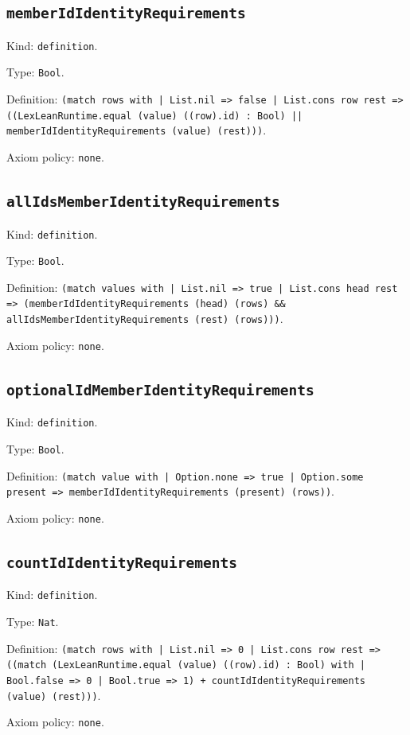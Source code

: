 \documentclass[11pt]{article}
\begin{document}
\subsection*{\texttt{memberIdIdentityRequirements}}
\noindent Kind: \texttt{definition}.\par
\noindent Type: \texttt{Bool}.\par
\noindent Definition: \texttt{(match rows with | List.nil => false | List.cons row rest => ((LexLeanRuntime.equal (value) ((row).id) : Bool) || memberIdIdentityRequirements (value) (rest)))}.\par
\noindent Axiom policy: \texttt{none}.\par
\subsection*{\texttt{allIdsMemberIdentityRequirements}}
\noindent Kind: \texttt{definition}.\par
\noindent Type: \texttt{Bool}.\par
\noindent Definition: \texttt{(match values with | List.nil => true | List.cons head rest => (memberIdIdentityRequirements (head) (rows) \&\& allIdsMemberIdentityRequirements (rest) (rows)))}.\par
\noindent Axiom policy: \texttt{none}.\par
\subsection*{\texttt{optionalIdMemberIdentityRequirements}}
\noindent Kind: \texttt{definition}.\par
\noindent Type: \texttt{Bool}.\par
\noindent Definition: \texttt{(match value with | Option.none => true | Option.some present => memberIdIdentityRequirements (present) (rows))}.\par
\noindent Axiom policy: \texttt{none}.\par
\subsection*{\texttt{countIdIdentityRequirements}}
\noindent Kind: \texttt{definition}.\par
\noindent Type: \texttt{Nat}.\par
\noindent Definition: \texttt{(match rows with | List.nil => 0 | List.cons row rest => ((match (LexLeanRuntime.equal (value) ((row).id) : Bool) with | Bool.false => 0 | Bool.true => 1) + countIdIdentityRequirements (value) (rest)))}.\par
\noindent Axiom policy: \texttt{none}.\par
\end{document}
